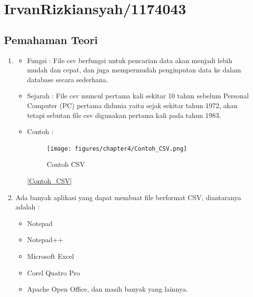 \section{IrvanRizkiansyah/1174043}
	\subsection{Pemahaman Teori}
		\begin{enumerate}
			\item \begin{itemize}
					\item Fungsi : File csv berfungsi untuk pencarian data akan menjadi lebih mudah dan cepat, dan juga mempermudah penginputan data ke dalam database secara sederhana.
					\item Sejarah : File csv muncul pertama kali sekitar 10 tahun sebelum Personal Computer (PC) pertama  didunia yaitu sejak sekitar tahun 1972, akan tetapi sebutan file csv digunakan pertama kali pada tahun 1983.
					\item Contoh : 
						\begin{figure} [ht]
							\centerline{\texttt{[image: figures/chapter4/Contoh\_CSV.png]}}
							\caption{Contoh CSV}
							\label{Contoh CSV}
						\end{figure}

					\ref{Contoh_CSV}
				\end{itemize}
			
			\item Ada banyak aplikasi yang dapat membuat file berformat CSV, diantaranya adalah :
				\begin{itemize}
					\item Notepad
					\item Notepad++
					\item Microsoft Excel
					\item Corel Quatro Pro
					\item Apache Open Office, dan masih banyak yang lainnya.
				\end{itemize}
			

\end{enumerate}
